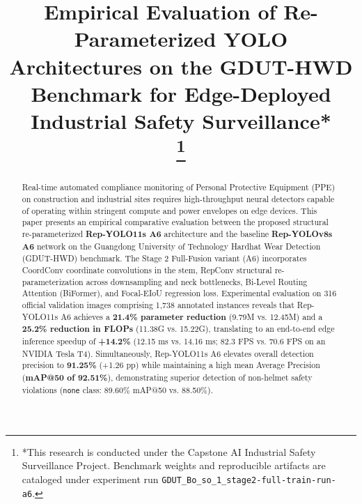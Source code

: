\documentclass[conference]{IEEEtran}
\begin{document}
\title{Empirical Evaluation of Re-Parameterized YOLO Architectures on the GDUT-HWD Benchmark for Edge-Deployed Industrial Safety Surveillance*\\
\thanks{*This research is conducted under the Capstone AI Industrial Safety Surveillance Project. Benchmark weights and reproducible artifacts are cataloged under experiment run \texttt{GDUT\_Bo\_so\_1\_stage2-full-train-run-a6}.}}

\author{
}

\maketitle

\begin{abstract}
Real-time automated compliance monitoring of Personal Protective Equipment (PPE) on construction and industrial sites requires high-throughput neural detectors capable of operating within stringent compute and power envelopes on edge devices. This paper presents an empirical comparative evaluation between the proposed structural re-parameterized \textbf{Rep-YOLO11s A6} architecture and the baseline \textbf{Rep-YOLOv8s A6} network on the Guangdong University of Technology Hardhat Wear Detection (GDUT-HWD) benchmark. The Stage 2 Full-Fusion variant (A6) incorporates CoordConv coordinate convolutions in the stem, RepConv structural re-parameterization across downsampling and neck bottlenecks, Bi-Level Routing Attention (BiFormer), and Focal-EIoU regression loss. Experimental evaluation on 316 official validation images comprising 1,738 annotated instances reveals that Rep-YOLO11s A6 achieves a \textbf{21.4\% parameter reduction} (9.79M vs. 12.45M) and a \textbf{25.2\% reduction in FLOPs} (11.38G vs. 15.22G), translating to an end-to-end edge inference speedup of \textbf{+14.2\%} (12.15 ms vs. 14.16 ms; 82.3 FPS vs. 70.6 FPS on an NVIDIA Tesla T4). Simultaneously, Rep-YOLO11s A6 elevates overall detection precision to \textbf{91.25\%} (+1.26 pp) while maintaining a high mean Average Precision (\textbf{mAP@50 of 92.51\%}), demonstrating superior detection of non-helmet safety violations (\texttt{none} class: 89.60\% mAP@50 vs. 88.50\%).
\end{abstract}
\end{document}

